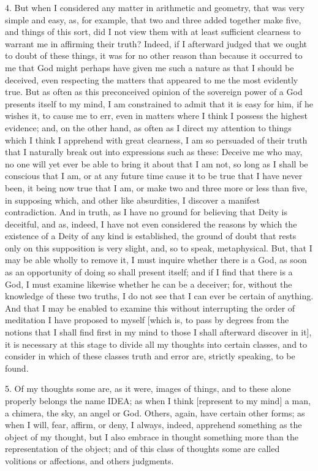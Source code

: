 4. But when I considered any matter in arithmetic and geometry, that was very simple and easy, as, for example, that two and three added together make five, and things of this sort, did I not view them with at least sufficient clearness to warrant me in affirming their truth? Indeed, if I afterward judged that we ought to doubt of these things, it was for no other reason than because it occurred to me that God might perhaps have given me such a nature as that I should be deceived, even respecting the matters that appeared to me the most evidently true. But as often as this preconceived opinion of the sovereign power of a God presents itself to my mind, I am constrained to admit that it is easy for him, if he wishes it, to cause me to err, even in matters where I think I possess the highest evidence; and, on the other hand, as often as I direct my attention to things which I think I apprehend with great clearness, I am so persuaded of their truth that I naturally break out into expressions such as these: Deceive me who may, no one will yet ever be able to bring it about that I am not, so long as I shall be conscious that I am, or at any future time cause it to be true that I have never been, it being now true that I am, or make two and three more or less than five, in supposing which, and other like absurdities, I discover a manifest contradiction. And in truth, as I have no ground for believing that Deity is deceitful, and as, indeed, I have not even considered the reasons by which the existence of a Deity of any kind is established, the ground of doubt that rests only on this supposition is very slight, and, so to speak, metaphysical. But, that I may be able wholly to remove it, I must inquire whether there is a God, as soon as an opportunity of doing so shall present itself; and if I find that there is a God, I must examine likewise whether he can be a deceiver; for, without the knowledge of these two truths, I do not see that I can ever be certain of anything. And that I may be enabled to examine this without interrupting the order of meditation I have proposed to myself [which is, to pass by degrees from the notions that I shall find first in my mind to those I shall afterward discover in it], it is necessary at this stage to divide all my thoughts into certain classes, and to consider in which of these classes truth and error are, strictly speaking, to be found.

5. Of my thoughts some are, as it were, images of things, and to these alone properly belongs the name IDEA; as when I think [represent to my mind] a man, a chimera, the sky, an angel or God. Others, again, have certain other forms; as when I will, fear, affirm, or deny, I always, indeed, apprehend something as the object of my thought, but I also embrace in thought something more than the representation of the object; and of this class of thoughts some are called volitions or affections, and others judgments.

